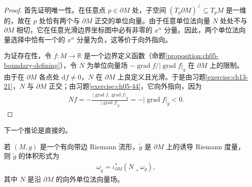 \documentclass[../../main.tex]{subfiles}
\begin{document}
\begin{proof}
首先证明唯一性。在任意点 $p\in\partial M$ 处，子空间 $(T_p\partial M)^\perp\subseteq T_pM$ 是一维的，故在 $p$ 处恰有两个与 $\partial M$ 正交的单位向量。由于任意单位法向量 $N$ 处处不与 $\partial M$ 相切，它在任意光滑边界坐标图中必有非零的 $x^n$ 分量。因此，两个单位法向量选择中恰有一个的 $x^n$ 分量为负，这等价于向外指向。

为证存在性，令 $f:M\to\mathbb{R}$ 是一个边界定义函数（命题\ref{proposition:ch05-boundary-defining}），令 $N$ 为单位向量场 $-\operatorname{grad}f/|\operatorname{grad}f|_g$ 在 $\partial M$ 上的限制。由于在 $\partial M$ 各点处 $\mathrm{d}f\ne0$，$N$ 在 $\partial M$ 上良定义且光滑。于是由习题\ref{exercise:ch13-21}，$N$ 与 $\partial M$ 正交；由习题\ref{exercise:ch05-44}，它向外指向，因为
\begin{align*}
Nf=-\frac{\langle\operatorname{grad}f,\operatorname{grad}f\rangle_g}{|\operatorname{grad}f|_g}=-|\operatorname{grad}f|_g<0.
\end{align*}
\end{proof}

下一个推论是直接的。

\begin{corollary}\label{corollary:ch15-boundary-volume}
若 $(M,g)$ 是一个有向带边 Riemann 流形，$\widetilde g$ 是 $\partial M$ 上的诱导 Riemann 度量，则 $\widetilde g$ 的体积形式为
\begin{align*}
\omega_{\widetilde g}=\iota_{\partial M}^*(N\lrcorner\omega_g),
\end{align*}
其中 $N$ 是沿 $\partial M$ 的向外单位法向量场。
\end{corollary}
\end{document}
